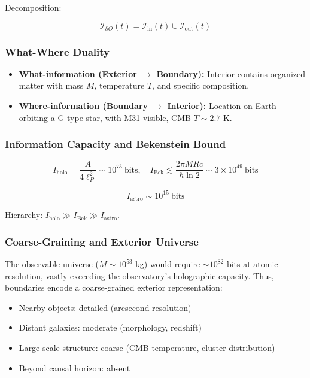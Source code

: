 ﻿\documentclass[12pt]{article}
\begin{document}
Decomposition:


\[
\mathcal{I}_{\partial O}(t) = \mathcal{I}_\mathrm{in}(t) \cup \mathcal{I}_\mathrm{out}(t)
\]


\subsubsection{What-Where Duality}


\begin{itemize}
  \item \textbf{What-information (Exterior $\to$ Boundary):} Interior contains organized matter with mass $M$, temperature $T$, and specific composition.
  \item \textbf{Where-information (Boundary $\to$ Interior):} Location on Earth orbiting a G-type star, with M31 visible, CMB $T\sim 2.7$ K.
\end{itemize}


\subsubsection{Information Capacity and Bekenstein Bound}


\[
I_\mathrm{holo} = \frac{A}{4\ell_P^2} \sim 10^{73}~\mathrm{bits}, \quad
I_\mathrm{Bek} \lesssim \frac{2\pi M R c}{\hbar \ln 2} \sim 3\times10^{49}~\mathrm{bits}
\]


\[
I_\mathrm{astro} \sim 10^{15}~\mathrm{bits}
\]


Hierarchy: $I_\mathrm{holo} \gg I_\mathrm{Bek} \gg I_\mathrm{astro}$.


\subsubsection{Coarse-Graining and Exterior Universe}


The observable universe ($M \sim 10^{53}$ kg) would require $\sim 10^{82}$ bits at atomic resolution, vastly exceeding the observatory’s holographic capacity. Thus, boundaries encode a coarse-grained exterior representation:


\begin{itemize}
  \item Nearby objects: detailed (arcsecond resolution)
  \item Distant galaxies: moderate (morphology, redshift)
  \item Large-scale structure: coarse (CMB temperature, cluster distribution)
  \item Beyond causal horizon: absent
\end{itemize}
\end{document}
